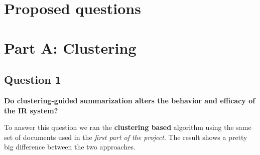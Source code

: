 \section{Proposed questions}

\section*{Part A: Clustering}

\subsection{Question 1}
\textbf{Do clustering-guided summarization alters the behavior and efficacy of the IR system?}

To answer this question we ran the \textbf{clustering based} algorithm using
the same set of documents used in the \textit{first part of the project}. The
result shows a pretty big difference between the two approaches.

